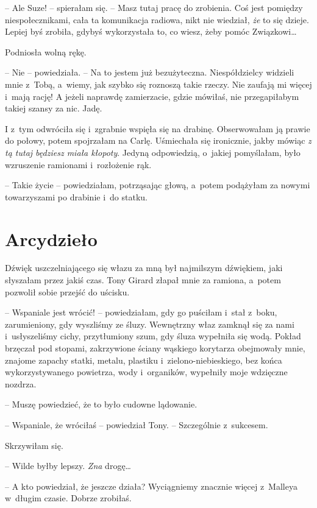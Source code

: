 \documentclass[oneside,polish,11pt,sfheadings]{mwbk}
\begin{document}
-- Ale Suze! -- spierałam się. -- Masz tutaj pracę do zrobienia. Coś jest
pomiędzy niespołecznikami, cała ta komunikacja radiowa, nikt nie
wiedział, \textit{że} to się dzieje. Lepiej byś zrobiła, gdybyś
wykorzystała to, co wiesz, żeby pomóc Związkowi\ldots 

Podniosła wolną rękę. 

-- Nie -- powiedziała. -- Na to jestem już
bezużyteczna. Niespółdzielcy widzieli mnie z~Tobą, a~wiemy, jak szybko
się roznoszą takie rzeczy. Nie zaufają mi więcej i~mają rację! A jeżeli
naprawdę zamierzacie, gdzie mówiłaś, nie przegapiłabym takiej szansy za
nic. Jadę.

I z~tym odwróciła się i~zgrabnie wspięła się na drabinę. Obserwowałam ją
prawie do połowy, potem spojrzałam na Carlę. Uśmiechała się ironicznie,
jakby mówiąc \textit{z tą tutaj będziesz miała kłopoty}. Jedyną
odpowiedzią, o~jakiej pomyślałam, było wzruszenie ramionami i~rozłożenie
rąk.

-- Takie życie -- powiedziałam, potrząsając głową, a~potem podążyłam za
nowymi towarzyszami po drabinie i~do statku.

\chapter{Arcydzieło}

Dźwięk uszczelniającego się włazu za mną był najmilszym dźwiękiem, jaki słyszałam przez jakiś czas. Tony Girard złapał mnie za
ramiona, a~potem pozwolił sobie przejść do uścisku.

-- Wspaniale jest wrócić! -- powiedziałam, gdy go puściłam i~stał z~boku,
zarumieniony, gdy wyszliśmy ze śluzy. Wewnętrzny właz zamknął się za
nami i~usłyszeliśmy cichy, przytłumiony szum, gdy śluza wypełniła się
wodą. Pokład brzęczał pod stopami, zakrzywione ściany wąskiego korytarza
obejmowały mnie, znajome zapachy statki, metalu, plastiku i~zielono-niebieskiego, bez końca wykorzystywanego powietrza, wody i~organików, wypełniły moje wdzięczne nozdrza. 

-- Muszę powiedzieć, że to
było cudowne lądowanie.

-- Wspaniale, że wróciłaś -- powiedział Tony. -- Szczególnie z~sukcesem.

Skrzywiłam się. 

-- Wilde byłby lepszy. \textit{Zna} drogę\ldots 

-- A kto powiedział, że jeszcze działa? Wyciągniemy znacznie więcej z~Malleya w~długim czasie. Dobrze zrobiłaś.
\end{document}
